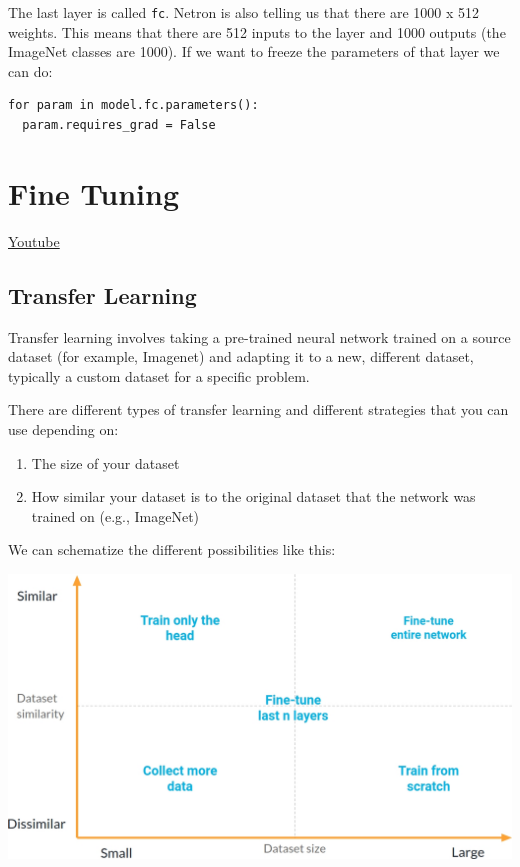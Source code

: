The last layer is called \verb|fc|. Netron is also telling us that there are 1000 x 512 weights. This means that there are 512 inputs to the layer and 1000 outputs (the ImageNet classes are 1000). If we want to freeze the parameters of that layer we can do:

\begin{lstlisting}
for param in model.fc.parameters():
  param.requires_grad = False
\end{lstlisting}

\section{Fine Tuning}
\href{https://www.youtube.com/watch?v=XOyb315xYbw&ab_channel=Udacity}{Youtube} 

\subsection{Transfer Learning}

Transfer learning involves taking a pre-trained neural network trained on a source dataset (for example, Imagenet) and adapting it to a new, different dataset, typically a custom dataset for a specific problem.\newline

There are different types of transfer learning and different strategies that you can use depending on:

\begin{enumerate}
    \item The size of your dataset
    \item How similar your dataset is to the original dataset that the network was trained on (e.g., ImageNet)
\end{enumerate}
We can schematize the different possibilities like this:

\includegraphics[width=1\linewidth]{img//cnn//transfer/fine-tune-quadrants.jpeg}


